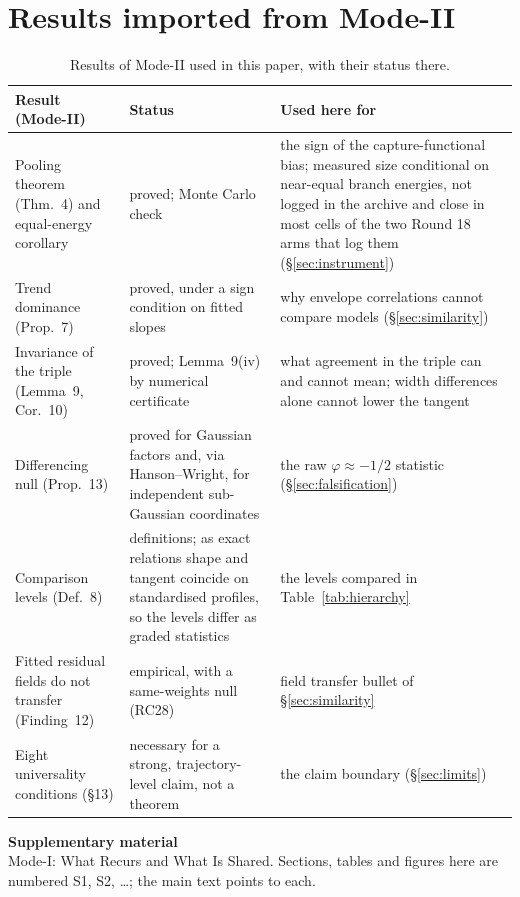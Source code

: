 \documentclass[11pt]{article}
\begin{document}
\section{Results imported from Mode-II}\label{app:imports}
\begin{table}[htbp]
\centering\small
\caption{Results of Mode-II used in this paper, with their status there.}
\label{tab:imports}
\begin{tabularx}{\linewidth}{@{}>{\raggedright\arraybackslash}p{3.6cm}>{\raggedright\arraybackslash}p{3.2cm}L@{}}
\toprule
Result (Mode-II) & Status & Used here for\\
\midrule
Pooling theorem (Thm.~4) and equal-energy corollary & proved; Monte Carlo check & the sign of the capture-functional bias; measured size conditional on near-equal branch energies, not logged in the archive and close in most cells of the two Round 18 arms that log them (\S\ref{sec:instrument})\\
Trend dominance (Prop.~7) & proved, under a sign condition on fitted slopes & why envelope correlations cannot compare models (\S\ref{sec:similarity})\\
Invariance of the triple (Lemma~9, Cor.~10) & proved; Lemma~9(iv) by numerical certificate & what agreement in the triple can and cannot mean; width differences alone cannot lower the tangent\\
Differencing null (Prop.~13) & proved for Gaussian factors and, via Hanson--Wright, for independent sub-Gaussian coordinates & the raw $\varphi\approx-1/2$ statistic (\S\ref{sec:falsification})\\
Comparison levels (Def.~8) & definitions; as exact relations shape and tangent coincide on standardised profiles, so the levels differ as graded statistics & the levels compared in Table~\ref{tab:hierarchy}\\
Fitted residual fields do not transfer (Finding~12) & empirical, with a same-weights null (RC28) & field transfer bullet of \S\ref{sec:similarity}\\
Eight universality conditions (\S13) & necessary for a strong, trajectory-level claim, not a theorem & the claim boundary (\S\ref{sec:limits})\\
\bottomrule
\end{tabularx}
\end{table}


\clearpage
\setcounter{section}{0}\setcounter{table}{0}\setcounter{figure}{0}
\renewcommand{\thesection}{S\arabic{section}}\renewcommand{\thetable}{S\arabic{table}}\renewcommand{\thefigure}{S\arabic{figure}}
\renewcommand{\theHsection}{S\arabic{section}}\renewcommand{\theHtable}{S\arabic{table}}\renewcommand{\theHfigure}{S\arabic{figure}}
\begin{center}{\Large\bfseries Supplementary material}\\[4pt]\small Mode-I: What Recurs and What Is Shared. Sections, tables and figures here are numbered S1, S2, \ldots; the main text points to each.\end{center}

\end{document}
